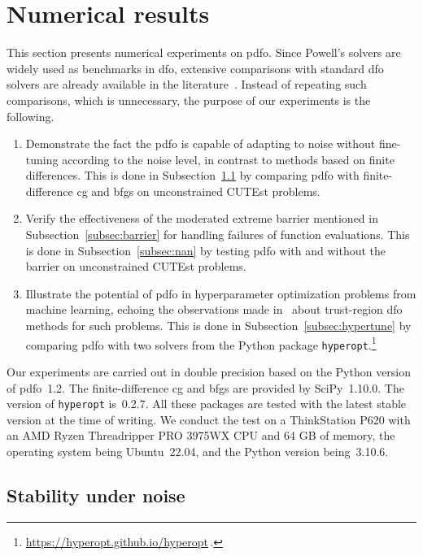 \documentclass[manuscript,screen,review]{acmart}
\numberwithin{equation}{section}
\begin{document}
\section{Numerical results}
\label{sec:numerical}

This section presents numerical experiments on \gls{pdfo}.
Since Powell's solvers are widely used as benchmarks in \gls{dfo}, extensive comparisons with standard \gls{dfo} solvers are already available in the literature~\cite{More_Wild_2009,Rios_Sahinidis_2013}.
Instead of repeating such comparisons, which is unnecessary, the purpose of our experiments is the following.
\begin{enumerate}
    \item Demonstrate the fact the \gls{pdfo} is capable of adapting to noise without fine-tuning according to the noise level, in contrast to methods based on finite differences.
    This is done in Subsection~\ref{subsec:noise} by comparing \gls{pdfo} with finite-difference \gls{cg} and \gls{bfgs} on unconstrained CUTEst problems.
    \item Verify the effectiveness of the moderated extreme barrier mentioned in Subsection~\ref{subsec:barrier} for handling failures of function evaluations.
    This is done in Subsection~\ref{subsec:nan} by testing \gls{pdfo} with and without the barrier on unconstrained CUTEst problems.
    \item Illustrate the potential of \gls{pdfo} in hyperparameter optimization problems from machine learning, echoing the observations made in~\cite{Ghanbari_Scheinberg_2017} about trust-region \gls{dfo} methods for such problems.
    This is done in Subsection~\ref{subsec:hypertune} by comparing \gls{pdfo} with two solvers from the Python package \texttt{hyperopt}.\footnote{\url{https://hyperopt.github.io/hyperopt}\,.}
\end{enumerate}

Our experiments are carried out in double precision based on the Python version of \gls{pdfo}~1.2.
The finite-difference \gls{cg} and \gls{bfgs} are provided by SciPy~1.10.0.
The version of \texttt{hyperopt} is~0.2.7.
All these packages are tested with the latest stable version at the time of writing.
We conduct the test on a ThinkStation P620 with an AMD Ryzen Threadripper PRO 3975WX CPU and 64 GB of memory, the operating system being Ubuntu~22.04, and the Python version being~3.10.6.

\subsection{Stability under noise}
\label{subsec:noise}
\end{document}
